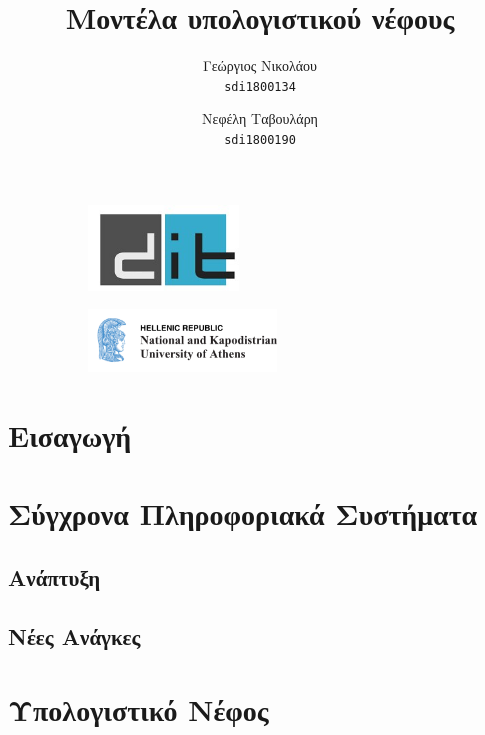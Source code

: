 \documentclass{article}
\title{%
  \selectlanguage{greek}\Huge
 Μοντέλα υπολογιστικού νέφους \\}
\begin{document}

\author{\LARGE
  Γεώργιος Νικολάου\\
   \texttt{\large sdi1800134}
  \and
  \LARGE
  Νεφέλη Ταβουλάρη\\
   \texttt{\large sdi1800190}
}

\maketitle


\begin{figure}
\centering
\begin{subfigure}
  \centering
  \includegraphics[width=40mm]{dit_logo}
  \label{fig:sub1}
\end{subfigure}%
\begin{subfigure}
  \centering
  \includegraphics[width=50mm]{NKUA_logo}
  \label{fig:sub2}
\end{subfigure}
\label{fig:test}
\end{figure}




\newpage
\tableofcontents
\newpage
\section{Εισαγωγή}
\section{Σύγχρονα Πληροφοριακά Συστήματα}
\subsection{Ανάπτυξη}
\subsection{Νέες Ανάγκες}
\section{Υπολογιστικό Νέφος}
\end{document}
